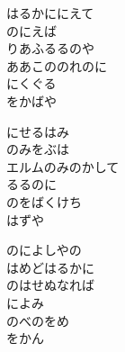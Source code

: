 \documentclass[10pt,b5j]{tarticle} %
\begin{document}
\vspace{1.5em} %
\newcommand{\linespace}{0.5em} %
\newcommand{\blocksize}{0.5\hsize} %
\begin{enumerate} %
    \begin{minipage}[c]{\blocksize}
    
        \vspace{\linespace}
        \item
        はるかににえて\\
        のにえば\\
        りあふるるのや\\
        ああこののれのに\\
        にくぐる\\
        をかばや
        
        \vspace{\linespace}
        \item
        にせるはみ\\
        のみをぶは\\
        エルムのみのかして\\
        るるのに\\
        のをばくけち\\
        はずや
        
        \vspace{\linespace}
        \item
        のによしやの\\
        はめどはるかに\\
        のはせぬなれば\\
        によみ\\
        のべのをめ\\
        をかん
        

\end{minipage}
\end{enumerate}
\end{document}
